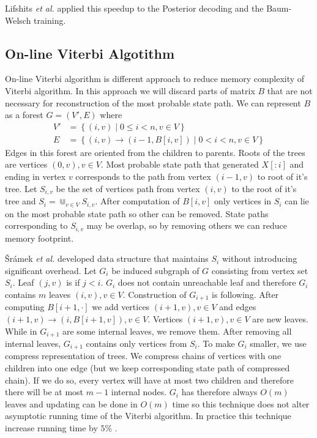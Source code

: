 Lifshits {\it et al.} applied this  speedup to the Posterior decoding and the
Baum-Welsch training.


\subsection{On-line Viterbi Algotithm}
\label{SECTION:ONLINEVITERBI}

On-line Viterbi algorithm is different approach to reduce memory complexity of
Viterbi algorithm. In this approach we will discard parts of matrix $B$ that 
are not necessary for reconstruction of the most probable state path.
We can represent $B$ as a forest $G=(V',E)$ where
\begin{align*}
V' &= \left\{ (i,v)\mid 0\leq i< n, v\in V  \right\}\\
E &= \left\{ (i,v)\to (i-1,B[i,v])\mid 0<i<n,v\in V\right\}
\end{align*}
Edges in this forest are oriented from the children to parents. Roots of the
trees are vertices $(0,v),v\in V$.  Most probable state path that generated
$X[:i]$ and ending in vertex $v$ corresponds to the path from vertex $(i-1,v)$
to root of it's tree. Let $S_{i,v}$ be the set of vertices path from vertex
$(i,v)$ to the root of it's tree and $S_i=\Cup_{v\in V}S_{i,v}$.
After computation of $B[i,v]$ only vertices in $S_i$ can lie on the most
probable state path so other can be removed. State paths corresponding to
$S_{i,v}$ may be overlap, so by removing others we can reduce memory
footprint.

{\v S}r{\'a}mek {\it et al.} developed data structure that maintains $S_i$
without introducing significant overhead.  Let $G_i$ be induced subgraph of $G$
consisting from vertex set $S_i$. Leaf $(j,v)$ is  if
$j<i$.  $G_i$ does not contain unreachable leaf and therefore $G_i$ contains $m$
leaves $(i,v),v\in V$. Construction of $G_{i+1}$ is following.
After computing $B[i+1,\cdot]$ we add vertices $(i+1,v),v\in V$ and edges 
$(i+1,v)\to (i,B[i+1,v]),v\in V$. Vertices $(i+1,v),v\in V$ are new leaves.
While in $G_{i+1}$ are some internal leaves, we remove them.
After removing all internal leaves, $G_{i+1}$ contains only vertices from $S_i$.
To make $G_i$ smaller, we use compress representation of trees. We compress
chains of vertices with one children into one edge (but we keep
corresponding state path of compressed chain). If we do so, every vertex will
have at most two children and therefore there will be at most $m-1$ internal
nodes. $G_i$ has therefore always $O(m)$ leaves and updating can be done in
$O(m)$ time so this technique does not alter asymptotic running time of the
Viterbi algorithm. In practice this technique increase running time by $5$\%
\cite{Sramek2007}.

